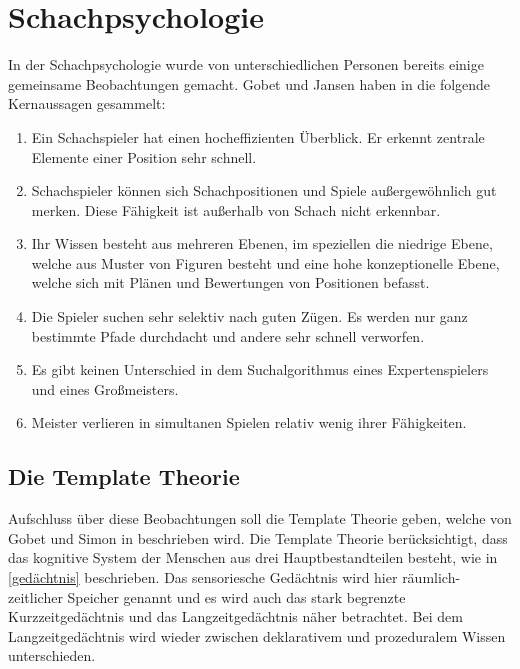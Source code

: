 \section{Schachpsychologie}%
In der Schachpsychologie wurde von unterschiedlichen Personen bereits einige gemeinsame Beobachtungen gemacht. Gobet und Jansen haben in \cite{gobet_training_2006} die folgende Kernaussagen gesammelt:

\begin{enumerate}
    \item Ein Schachspieler hat einen hocheffizienten Überblick. Er erkennt zentrale Elemente einer Position sehr schnell.
    \item Schachspieler können sich Schachpositionen und Spiele außergewöhnlich gut merken. Diese Fähigkeit ist außerhalb von Schach nicht erkennbar.
    \item Ihr Wissen besteht aus mehreren Ebenen, im speziellen die niedrige Ebene, welche aus Muster von Figuren besteht und eine hohe konzeptionelle Ebene, welche sich mit Plänen und Bewertungen von Positionen befasst.
    \item Die Spieler suchen sehr selektiv nach guten Zügen. Es werden nur ganz bestimmte Pfade durchdacht und andere sehr schnell verworfen.
    \item Es gibt keinen Unterschied in dem Suchalgorithmus eines Expertenspielers und eines Großmeisters.
    \item Meister verlieren in simultanen Spielen relativ wenig ihrer Fähigkeiten.
\end{enumerate}

\subsection{Die Template Theorie}
Aufschluss über diese Beobachtungen soll die Template Theorie geben, welche von Gobet und Simon in \cite{gobet_templates_1996} beschrieben wird. Die Template Theorie berücksichtigt, dass das kognitive System der Menschen aus drei Hauptbestandteilen besteht, wie in \autoref{gedächtnis} beschrieben.
Das sensoriesche Gedächtnis wird hier räumlich-zeitlicher Speicher genannt und es wird auch das stark begrenzte Kurzzeitgedächtnis und das Langzeitgedächtnis näher betrachtet.
Bei dem Langzeitgedächtnis wird wieder zwischen deklarativem und prozeduralem Wissen unterschieden.
\cite{gobet_training_2006}


